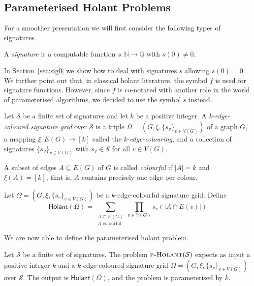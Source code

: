 \documentclass[authorcolumns,numberwithinsect]{no-lipics-v2022}
\newcommand{\holant}{\mathsf{Holant}}
\begin{document}
\subsection{Parameterised Holant Problems}
For a smoother presentation we will first consider the following types of signatures.
\begin{definition}
    A \emph{signature} is a computable function $s:\mathbb{N} \to \mathbb{Q}$ with $s(0)\neq 0$.
\end{definition}
In Section~\ref{sec:sig0} we show how to deal with signatures $s$ allowing $s(0)=0$. We further point out that, in classical holant literature, the symbol $f$ is used for signature functions. However, since $f$ is co-notated with another role in the world of parameterised algorithms, we decided to use the symbol $s$ instead. 

\begin{definition}
    Let $\mathcal{S}$ be a finite set of signatures and let $k$ be a positive integer.
    A $k$-\emph{edge-coloured signature grid} over $\mathcal{S}$ is a triple $\Omega=(G,\xi,\{s_v\}_{v\in V(G)})$ of a graph $G$, a mapping $\xi:E(G) \to [k]$ called the $k$-\emph{edge-colouring}, and a collection of signatures $\{s_v\}_{v\in V(G)}$ with $s_v \in \mathcal{S}$ for all $v\in V(G)$.

    A subset of edges $A\subseteq E(G)$ of $G$ is called \emph{colourful} if $|A|=k$ and $\xi(A)=[k]$, that is, $A$ contains precisely one edge per colour.
\end{definition}

\begin{definition}
    Let $\Omega=(G,\xi,\{s_v\}_{v\in V(G)})$ be a $k$-edge-colourful signature grid. Define
    \[ \holant(\Omega) = \sum_{\substack{A \subseteq E(G)\\ A \text{ colourful}}} \prod_{v\in V(G)} s_v(|A \cap E(v)|) \]
\end{definition}

We are now able to define the parameterised holant problem.

\begin{definition}
    Let $\mathcal{S}$ be a finite set of signatures. The problem $\textsc{p-Holant}(\mathcal{S})$ expects as input a positive integer $k$ and a $k$-edge-coloured signature grid $\Omega=(G,\xi,\{s_v\}_{v\in V(G)})$ over $\mathcal{S}$. The output is $\holant(\Omega)$, and the problem is parameterised by $k$. 
\end{definition}
\end{document}
